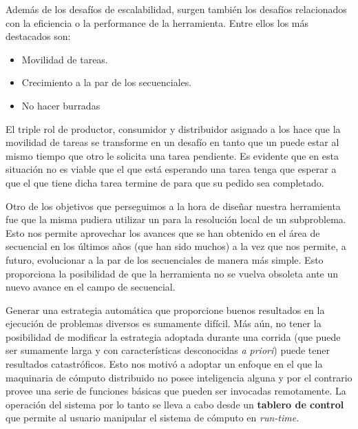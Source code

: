 Además de los desafíos de escalabilidad, surgen también los desafíos
relacionados con la eficiencia o la performance de la herramienta. Entre ellos
los más destacados son:

\begin{itemize}
	\item Movilidad de tareas.
	\item Crecimiento a la par de los \ssolvers secuenciales.
	\item No hacer burradas 
\end{itemize}

El triple rol de productor, consumidor y distribuidor asignado a los \ws hace
que la movilidad de tareas se transforme en un desafío en tanto que un \w
puede estar \solveando al mismo tiempo que otro \w le solicita una tarea
pendiente. Es evidente que en esta situación no es viable que el \w que está
esperando una tarea tenga que esperar a que el \w que tiene dicha tarea
termine de \solvear para que su pedido sea completado.

Otro de los objetivos que perseguimos a la hora de diseñar nuestra herramienta
fue que la misma pudiera utilizar un \ssolver \ots para la resolución local de
un subproblema. Esto nos permite aprovechar los avances que se han obtenido en
el área de \ssolving secuencial en los últimos años (que han sido muchos) a la
vez que nos permite, a futuro, evolucionar a la par de los \ssolvers
secuenciales de manera más simple. Esto proporciona la posibilidad de que la
herramienta no se vuelva obsoleta ante un nuevo avance en el campo de
\ssolving secuencial.

\newcommand{\rt}{\emph{run-time}\xspace}
\newcommand{\apriori}{\emph{a priori}\xspace}

Generar una estrategia automática que proporcione buenos resultados en la
ejecución de problemas diversos es sumamente difícil. Más aún, no tener la
posibilidad de modificar la estrategia adoptada durante una corrida (que puede
ser sumamente larga y con características desconocidas \apriori) puede tener
resultados catastróficos. Esto nos motivó a adoptar un enfoque en el que la
maquinaria de cómputo distribuido no posee inteligencia alguna y por el
contrario provee una serie de funciones básicas que pueden ser invocadas
remotamente. La operación del sistema por lo tanto se lleva a cabo desde un
\textbf{tablero de control} que permite al usuario manipular el sistema de
cómputo en \rt.

\

